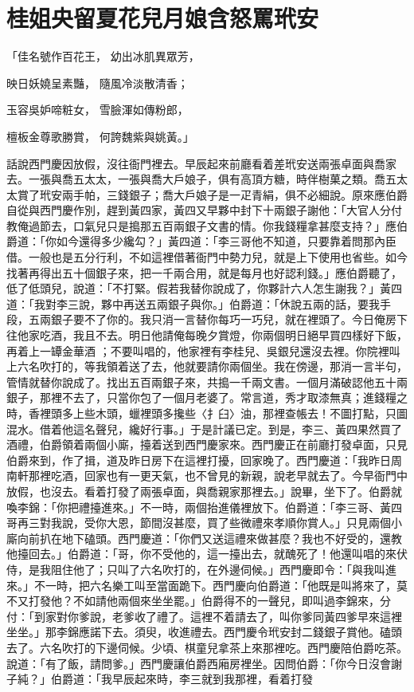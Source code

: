 %

\chapter{桂姐央留夏花兒\KG 月娘含怒罵玳安}

「佳名號作百花王，  幼出冰肌異眾芳，

映日妖嬈呈素豔，  隨風冷淡散清香；

玉容吳妒啼粧女，  雪臉渾如傳粉郎，

檀板金尊歌勝賞，  何誇魏紫與姚黃。」

話說西門慶因放假，沒往衙門裡去。早辰起來前廳看着差玳安送兩張卓面與喬家去。一張與喬五太太，一張與喬大戶娘子，俱有高頂方糖，時伴樹菓之類。喬五太太賞了玳安兩手帕，三錢銀子；喬大戶娘子是一疋青絹，俱不必細說。原來應伯爵自從與西門慶作別，趕到黃四家，黃四又早夥中封下十兩銀子謝他：「大官人分付教俺過節去，口氣兒只是搗那五百兩銀子文書的情。你我錢糧拿甚麼支持？」應伯爵道：「你如今還得多少纔勾？」黃四道：「李三哥他不知道，只要靠着問那內臣借。一般也是五分行利，不如這裡借著衙門中勢力兒，就是上下使用也省些。如今找著再得出五十個銀子來，把一千兩合用，就是每月也好認利錢。」應伯爵聽了，低了低頭兒，說道：「不打緊。假若我替你說成了，你夥計六人怎生謝我？」黃四道：「我對李三說，夥中再送五兩銀子與你。」伯爵道：「休說五兩的話，要我手段，五兩銀子要不了你的。我只消一言替你每巧一巧兒，就在裡頭了。今日俺房下往他家吃酒，我且不去。明日他請俺每晚夕賞燈，你兩個明日絕早買四樣好下飯，再着上一罈金華酒 ；不要叫唱的，他家裡有李桂兒、吳銀兒還沒去裡。你院裡叫上六名吹打的，等我領着送了去，他就要請你兩個坐。我在傍邊，那消一言半句，管情就替你說成了。找出五百兩銀子來，共搗一千兩文書。一個月滿破認他五十兩銀子，那裡不去了，只當你包了一個月老婆了。常言道，秀才取漆無真；進錢糧之時，香裡頭多上些木頭，蠟裡頭多攙些〈扌臼〉油，那裡查帳去！不圖打點，只圖混水。借着他這名聲兒，纔好行事。」于是計議已定。到是，李三、黃四果然買了酒禮，伯爵領着兩個小廝，擡着送到西門慶家來。西門慶正在前廳打發卓面，只見伯爵來到，作了揖，道及昨日房下在這裡打擾，回家晚了。西門慶道：「我昨日周南軒那裡吃酒，回家也有一更天氣，也不曾見的新親，說老早就去了。今早衙門中放假，也沒去。看着打發了兩張卓面，與喬親家那裡去。」說畢，坐下了。伯爵就喚李錦：「你把禮擡進來。」不一時，兩個抬進儀裡放下。伯爵道：「李三哥、黃四哥再三對我說，受你大恩，節間沒甚麼，買了些微禮來孝順你賞人。」只見兩個小廝向前扒在地下磕頭。西門慶道：「你們又送這禮來做甚麼？我也不好受的，還教他擡回去。」伯爵道：「哥，你不受他的，這一擡出去，就醜死了！他還叫唱的來伏侍，是我阻住他了；只叫了六名吹打的，在外邊伺候。」西門慶即令：「與我叫進來。」不一時，把六名樂工叫至當面跪下。西門慶向伯爵道：「他既是叫將來了，莫不又打發他？不如請他兩個來坐坐罷。」伯爵得不的一聲兒，即叫過李錦來，分付：「到家對你爹說，老爹收了禮了。這裡不着請去了，叫你爹同黃四爹早來這裡坐坐。」那李錦應諾下去。須臾，收進禮去。西門慶令玳安封二錢銀子賞他。磕頭去了。六名吹打的下邊伺候。少頃、棋童兒拿茶上來那裡吃。西門慶陪伯爵吃茶。說道：「有了飯，請問爹。」西門慶讓伯爵西廂房裡坐。因問伯爵：「你今日沒會謝子純？」伯爵道：「我早辰起來時，李三就到我那裡，看着打發